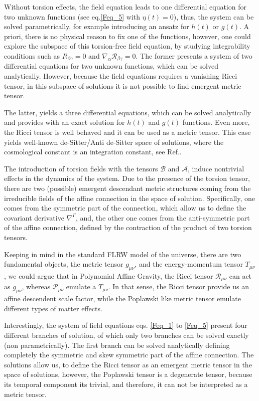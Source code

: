 Without torsion effects, the field equation leads to one differential equation for two 
unknown functions (see eq.\eqref{Feq_5} with $\eta(t) = 0$), thus, the system can be 
solved parametrically, for example introducing an ansatz for $h(t)$ or $g(t)$. A priori, there 
is no physical reason to fix one of the functions, however, one could explore the subspace of 
this torsion-free field equation, by studying  integrability conditions such as ${R}_{\beta\gamma} = 0$ 
and $\nabla_\alpha \mathcal{R}_{\beta\gamma} = 0$. The former presents a system of two differential
equations for two unknown functions, which can be solved analytically. However, because the field
equations requires a vanishing Ricci tensor, in this subspace of solutions it is not possible
to find emergent metric tensor. 

The latter, yields a three differential equations, which can 
be solved analytically and provides with an exact solution for $h(t)$ and $g(t)$ functions. 
Even more, the Ricci tensor is well behaved and it can be used as a metric tensor. This case 
yields well-known de-Sitter/Anti de-Sitter space of solutions, where the cosmological constant is an
integration constant, see Ref.\cite{Castillo_Felisola_2020}.

The introduction of torsion fields with the tensors $\mathcal{B}$ and $\mathcal{A}$, induce 
nontrivial effects in the dynamics of the system. Due to the presence of the torsion tensor, 
there are two (possible) emergent descendant metric structures coming from the irreducible fields of the 
affine connection in the space of solution. Specifically, one comes from the symmetric part 
of the connection, which allow us to define the covariant derivative $\nabla^{\Gamma}$, and, 
the other one comes from  the anti-symmetric part of the affine connection, defined by the 
contraction of the product of two torsion tensors. 

Keeping in mind in the standard FLRW model of the universe, there are two fundamental objects, 
the metric tensor $g_{\mu\nu}$, and the energy-momentum tensor $T_{\mu\nu}$, we could argue
that in Polynomial Affine Gravity, the Ricci tensor $\mathcal{R}_{\mu\nu}$ can act as $g_{\mu\nu}$,
whereas $\mathcal{P}_{\mu\nu}$ emulate a $T_{\mu\nu}$. In that sense, the Ricci tensor provide us
an affine descendent scale factor, while the Poplawski like metric tensor emulate different types 
of matter effects.

Interestingly, the system of field equations eqs. \eqref{Feq_1} to \eqref{Feq_5} present four different 
branches of solution, of which only two branches can be solved exactly (non parametrically). The first
branch can be solved analytically defining completely the symmetric and skew symmetric part of the
affine connection. The solutions allow us, to define the Ricci tensor as an emergent metric
tensor in the space of solutions, however, the Poplawski tensor is a degenerate tensor, because its
temporal component its trivial, and therefore, it can not be interpreted as a metric tensor.

